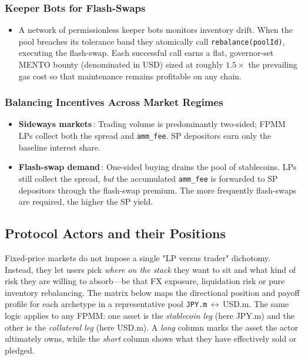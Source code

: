 \documentclass[a4paper]{article}
\providecommand{\hyp}{-}
\theoremstyle{definition}
\begin{document}
\subsubsection*{Keeper Bots for Flash\hyp Swaps}
\begin{itemize}
\item A network of permissionless keeper bots monitors inventory drift.  When the pool breaches its tolerance band they atomically call \verb|rebalance(poolId)|, executing the flash\hyp swap.  Each successful call earns a flat, governor\hyp set MENTO bounty (denominated in USD) sized at roughly $1.5\times$ the prevailing gas cost so that maintenance remains profitable on any chain.
\end{itemize}

\subsubsection*{Balancing Incentives Across Market Regimes}
\begin{itemize}
  \item \textbf{Sideways markets}\,:  Trading volume is predominantly two\hyp sided; FPMM LPs collect both the spread and \texttt{amm\_fee}.  SP depositors earn only the baseline interest share.
  \item \textbf{Flash\hyp swap demand}\,:  One\hyp sided buying drains the pool of stablecoins.  LPs still collect the spread, \emph{but} the accumulated \texttt{amm\_fee} is forwarded to SP depositors through the flash\hyp swap premium.  The more frequently flash\hyp swaps are required, the higher the SP yield.
\end{itemize}

\subsection{Protocol Actors and their Positions}
Fixed\hyp price markets do not impose a single "LP versus trader" dichotomy.
Instead, they let users pick \emph{where on the stack} they want to sit and what
kind of risk they are willing to absorb—be that FX exposure, liquidation risk
or pure inventory rebalancing.  The matrix below maps the directional position
and payoff profile for each archetype in a representative pool
\texttt{JPY.m}\,$\leftrightarrow$\,USD.m.  The same logic applies to any
FPMM: one asset is the \emph{stablecoin leg} (here JPY.m) and the other is the
\emph{collateral leg} (here USD.m).  A \emph{long} column marks the asset the
actor ultimately owns, while the \emph{short} column shows what they have
effectively sold or pledged.
\end{document}
